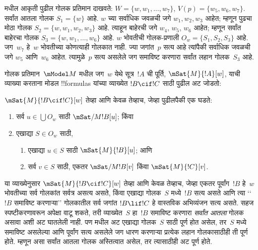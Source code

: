 \documentclass[../../../include/open-logic-section]{subfiles}
\begin{document}
 मधील
आकृती पुढील गोलक प्रतिमान
दाखवते: $W = \{w, w_1, \dots, w_7\}$,
$V(p) = \{w_5, w_6,
w_7\}$. सर्वांत आतला गोलक
$S_1 = \{w\}$ आहे.
$w$ च्या सर्वाधिक जवळची
जगे $w_1, w_2, w_3$
आहेत; म्हणून पुढचा मोठा
गोलक $S_2 = \{w, w_1,
w_2, w_3\}$ आहे.
त्याहून बाहेरची जगे
$w_4$, $w_5$, $w_6$
आहेत; म्हणून सर्वांत
बाहेरचा गोलक
$S_3 = \{w, w_1, \dots, w_6\}$
आहे. $w$ भोवतीची
गोलक-प्रणाली
$O_w = \{S_1, S_2, S_3\}$
आहे. जग~$w_7$ हे~$w$
भोवतीच्या कोणत्याही गोलकात
नाही. ज्या जगांत~$p$
सत्य आहे त्यांपैकी
सर्वाधिक जवळची जगे
$w_5$ आणि~$w_6$
आहेत. त्यामुळे~$p$
सत्य असलेले जग
समाविष्ट करणारा सर्वांत
लहान गोलक~$S_3$ आहे.

गोलक प्रतिमान~$\mModel M$
मधील जग~$w$ येथे
सूत्र~$!A$ ची पूर्ति,
$\mSat{M}{!A}[w]$,
याची व्याख्या करताना
मोडल !!{formula}s
यांच्या व्याख्येत
$!B \cif !C$
साठी पुढील अट जोडतो:

\begin{defn}
  $\mSat{M}{!B \cif !C}[w]$
  तेव्हा आणि केवळ तेव्हाच,
  जेव्हा पुढीलपैकी एक घडते:
  \begin{enumerate}
  \item{}
    सर्व $u \in \bigcup O_w$
    साठी $\mSat/{M}{!B}[u]$; किंवा
  \item{}
    एखाद्या $S \in O_w$ साठी,
    \begin{enumerate}
      \item एखाद्या $u \in
        S$ साठी
        $\mSat{M}{!B}[u]$; आणि
      \item सर्व $v \in S$
        साठी, एकतर
        $\mSat/{M}{!B}[v]$
        किंवा
        $\mSat{M}{!C}[v]$.
    \end{enumerate}
  \end{enumerate}
\end{defn}

या व्याख्येनुसार
$\mSat{M}{!B \cif !C}[w]$
तेव्हा आणि केवळ तेव्हाच, जेव्हा
एकतर पूर्वांग~$!B$
हे~$w$ भोवतीच्या सर्व
गोलकांत सर्वत्र असत्य असते,
किंवा एखाद्या गोलक~$S$
मध्ये~$!B$ सत्य असते आणि
त्या ‘‘$!B$ समाविष्ट
करणाऱ्या’’ गोलकातील
सर्व जगांत
$!B \lif !C$
हे वास्तविक अभिव्यंजन
सत्य असते.
सहज स्पष्टीकरणावरून
अपेक्षा वाटू शकते,
तरी व्याख्येत~$S$
हा~$!B$ समाविष्ट
करणारा \emph{सर्वांत
आतला} गोलक असावा
अशी अट घातलेली नाही.
पण 
मधील अट एखाद्या
गोलक~$S$ साठी
पूर्ण होत असेल,
तर~$S$ मध्ये
समाविष्ट असलेल्या आणि
पूर्वांग सत्य असलेले जग
धारण करणाऱ्या प्रत्येक
लहान गोलकासाठीही
ती पूर्ण होते.
म्हणून असा सर्वांत
आतला गोलक अस्तित्वात
असेल, तर त्यासाठीही
अट पूर्ण होते.
\end{document}
